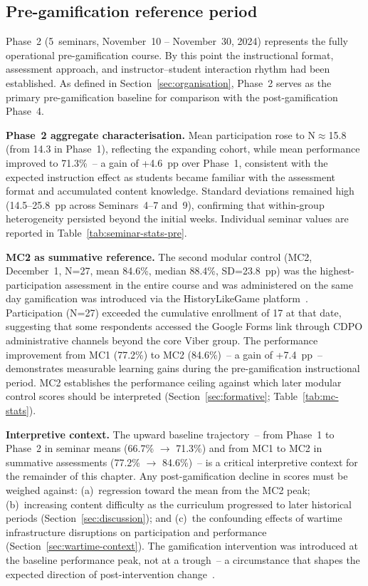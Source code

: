\subsection{Pre-gamification reference period}

Phase~2 (5~seminars, November~10 -- November~30, 2024) represents the fully operational pre-gamification course. By this point the instructional format, assessment approach, and instructor--student interaction rhythm had been established. As defined in Section~\ref{sec:organisation}, Phase~2 serves as the primary pre-gamification baseline for comparison with the post-gamification Phase~4.

\textbf{Phase~2 aggregate characterisation.} Mean participation rose to N$\approx$15.8 (from 14.3 in Phase~1), reflecting the expanding cohort, while mean performance improved to 71.3\%~-- a gain of +4.6~pp over Phase~1, consistent with the expected instruction effect as students became familiar with the assessment format and accumulated content knowledge. Standard deviations remained high (14.5--25.8~pp across Seminars~4--7 and~9), confirming that within-group heterogeneity persisted beyond the initial weeks. Individual seminar values are reported in Table~\ref{tab:seminar-stats-pre}.

\textbf{MC2 as summative reference.} The second modular control (MC2, December~1, N=27, mean 84.6\%, median 88.4\%, SD=23.8~pp) was the highest-participation assessment in the entire course and was administered on the same day gamification was introduced via the HistoryLikeGame platform~\cite{KorniienkoSemerikov2024}. Participation (N=27) exceeded the cumulative enrollment of 17 at that date, suggesting that some respondents accessed the Google Forms link through CDPO administrative channels beyond the core Viber group. The performance improvement from MC1 (77.2\%) to MC2 (84.6\%)~-- a gain of +7.4~pp~-- demonstrates measurable learning gains during the pre-gamification instructional period. MC2 establishes the performance ceiling against which later modular control scores should be interpreted (Section~\ref{sec:formative}; Table~\ref{tab:mc-stats}).

\textbf{Interpretive context.} The upward baseline trajectory~-- from Phase~1 to Phase~2 in seminar means (66.7\% $\to$ 71.3\%) and from MC1 to MC2 in summative assessments (77.2\% $\to$ 84.6\%)~-- is a critical interpretive context for the remainder of this chapter. Any post-gamification decline in scores must be weighed against: (a)~regression toward the mean from the MC2 peak; (b)~increasing content difficulty as the curriculum progressed to later historical periods (Section~\ref{sec:discussion}); and (c)~the confounding effects of wartime infrastructure disruptions on participation and performance (Section~\ref{sec:wartime-context}). The gamification intervention was introduced at the baseline performance peak, not at a trough~-- a circumstance that shapes the expected direction of post-intervention change~\cite{Hamari2014, DichevDicheva2017}.

